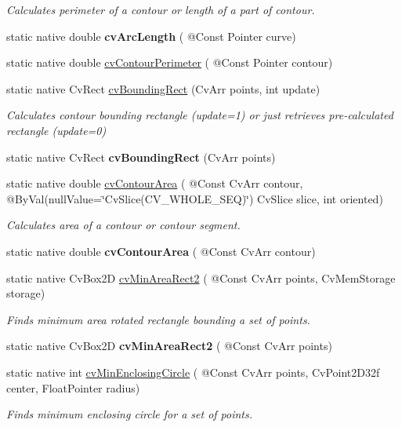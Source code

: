 \begin{DoxyCompactItemize}
\begin{DoxyCompactList}\small\item\em Calculates perimeter of a contour or length of a part of contour. \end{DoxyCompactList}\item 
static native double {\bfseries cv\+Arc\+Length} ( @Const Pointer curve)
\item 
static native double \hyperlink{group__imgproc__c_ga420bd05e2f839e52bdb1db41cea427af}{cv\+Contour\+Perimeter} ( @Const Pointer contour)
\item 
static native Cv\+Rect \hyperlink{group__imgproc__c_ga83c0146f56d5c70d0eb462023220933e}{cv\+Bounding\+Rect} (Cv\+Arr points, int update)
\begin{DoxyCompactList}\small\item\em Calculates contour bounding rectangle (update=1) or just retrieves pre-\/calculated rectangle (update=0) \end{DoxyCompactList}\item 
static native Cv\+Rect {\bfseries cv\+Bounding\+Rect} (Cv\+Arr points)
\item 
static native double \hyperlink{group__imgproc__c_gad23835119946d5ed21a357412881bb58}{cv\+Contour\+Area} ( @Const Cv\+Arr contour, @By\+Val(null\+Value=\char`\"{}Cv\+Slice(C\+V\+\_\+\+W\+H\+O\+L\+E\+\_\+\+S\+EQ)\char`\"{}) Cv\+Slice slice, int oriented)
\begin{DoxyCompactList}\small\item\em Calculates area of a contour or contour segment. \end{DoxyCompactList}\item 
static native double {\bfseries cv\+Contour\+Area} ( @Const Cv\+Arr contour)
\item 
static native Cv\+Box2D \hyperlink{group__imgproc__c_ga4c0de18f88f591ddd8e7c21559b28813}{cv\+Min\+Area\+Rect2} ( @Const Cv\+Arr points, Cv\+Mem\+Storage storage)
\begin{DoxyCompactList}\small\item\em Finds minimum area rotated rectangle bounding a set of points. \end{DoxyCompactList}\item 
static native Cv\+Box2D {\bfseries cv\+Min\+Area\+Rect2} ( @Const Cv\+Arr points)
\item 
static native int \hyperlink{group__imgproc__c_ga20312fae33ba176dda93b108421e4fc7}{cv\+Min\+Enclosing\+Circle} ( @Const Cv\+Arr points, Cv\+Point2\+D32f center, Float\+Pointer radius)
\begin{DoxyCompactList}\small\item\em Finds minimum enclosing circle for a set of points. \end{DoxyCompactList}\item 

\end{DoxyCompactItemize}
